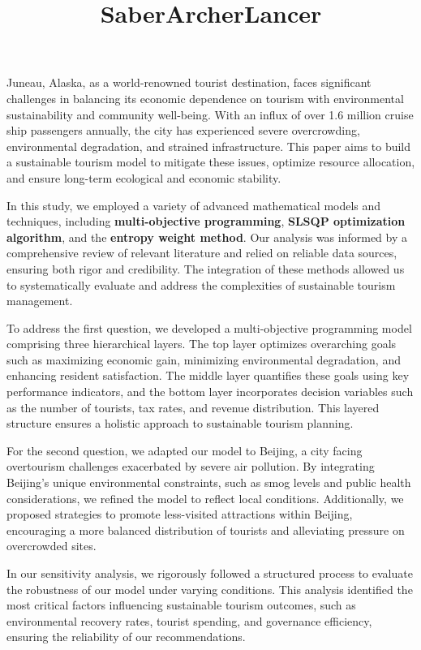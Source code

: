 \documentclass[UTF8]{mcmthesis}
\title{\bfseries SaberArcherLancer}  %
\begin{document}
    \begin{summary}
        \hspace*{2em} Juneau, Alaska, as a world-renowned tourist destination, faces significant challenges in balancing its economic dependence on tourism with environmental sustainability and community well-being. With an influx of over 1.6 million cruise ship passengers annually, the city has experienced severe overcrowding, environmental degradation, and strained infrastructure. This paper aims to build a sustainable tourism model to mitigate these issues, optimize resource allocation, and ensure long-term ecological and economic stability.

        In this study, we employed a variety of advanced mathematical models and techniques, including \textbf{multi-objective programming}, \textbf{SLSQP optimization algorithm}, and the \textbf{entropy weight method}. Our analysis was informed by a comprehensive review of relevant literature and relied on reliable data sources, ensuring both rigor and credibility. The integration of these methods allowed us to systematically evaluate and address the complexities of sustainable tourism management.

        To address the first question, we developed a multi-objective programming model comprising three hierarchical layers. The top layer optimizes overarching goals such as maximizing economic gain, minimizing environmental degradation, and enhancing resident satisfaction. The middle layer quantifies these goals using key performance indicators, and the bottom layer incorporates decision variables such as the number of tourists, tax rates, and revenue distribution. This layered structure ensures a holistic approach to sustainable tourism planning.

        For the second question, we adapted our model to Beijing, a city facing overtourism challenges exacerbated by severe air pollution. By integrating Beijing's unique environmental constraints, such as smog levels and public health considerations, we refined the model to reflect local conditions. Additionally, we proposed strategies to promote less-visited attractions within Beijing, encouraging a more balanced distribution of tourists and alleviating pressure on overcrowded sites.

        In our sensitivity analysis, we rigorously followed a structured process to evaluate the robustness of our model under varying conditions. This analysis identified the most critical factors influencing sustainable tourism outcomes, such as environmental recovery rates, tourist spending, and governance efficiency, ensuring the reliability of our recommendations.


\end{summary}
\end{document}
